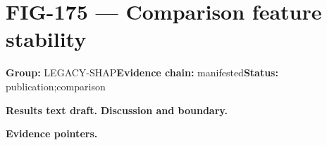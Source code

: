 \clearpage
\section{FIG-175 --- Comparison feature stability}
\label{figpage:fig-175}
\textbf{Group:} LEGACY-SHAP\quad \textbf{Evidence chain:} manifested\quad \textbf{Status:} publication;comparison

\textbf{Results text draft.} 
\textbf{Discussion and boundary.} 


\textbf{Evidence pointers.}



\vfill
